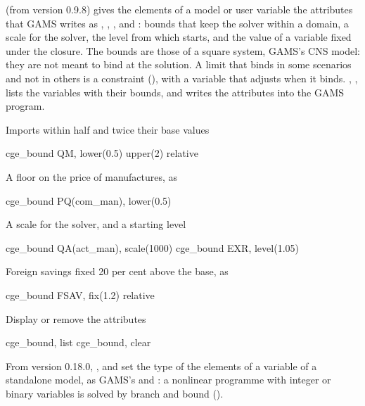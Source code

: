 

 (from version 0.9.8) gives the elements of a model or user
variable the attributes that GAMS writes as , ,
,  and : bounds that keep the solver within a
domain, a scale for the solver, the level from which 
starts, and the value of a variable fixed under the closure. The bounds are
those of a square system, GAMS's CNS model: they are not meant to bind at the
solution. A limit that binds in some scenarios and not in others is a
constraint (), with a variable that adjusts when it
binds. , , lists the variables with their
bounds, and  writes the attributes into the GAMS program.


Imports within half and twice their base values
\begin{stcode}
cge_bound QM, lower(0.5) upper(2) relative
\end{stcode}
A floor on the price of manufactures, as 
\begin{stcode}
cge_bound PQ(com_man), lower(0.5)
\end{stcode}
A scale for the solver, and a starting level
\begin{stcode}
cge_bound QA(act_man), scale(1000)
cge_bound EXR, level(1.05)
\end{stcode}
Foreign savings fixed 20 per cent above the base, as 
\begin{stcode}
cge_bound FSAV, fix(1.2) relative
\end{stcode}
Display or remove the attributes
\begin{stcode}
cge_bound, list
cge_bound, clear
\end{stcode}

From version 0.18.0, ,  and
 set the type of the elements of a variable of a standalone
model, as GAMS's  and : a nonlinear
programme with integer or binary variables is solved by branch and bound
().


